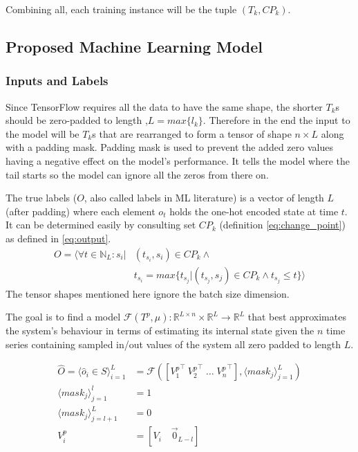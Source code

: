 Combining all, each training instance will be the tuple $(T_k, CP_k)$.

\subsection{Proposed Machine Learning Model}
\subsubsection{Inputs and Labels} \label{data_set_properties}


Since TensorFlow requires all the data to have the same shape, the shorter $T_k$s should be zero-padded to length ,$L = max\{l_k\}$.
Therefore in the end the input to the model will be $T_k$s that are rearranged to form a tensor of shape $n \times L$ along with a padding mask. Padding mask is used to prevent the added zero values having a negative effect on the model's performance. It tells the model where the tail starts so the model can ignore all the zeros from there on.

The true labels ($O$, also called labels in ML literature) is a vector of length $L$ (after padding) where each element $o_t$ holds the one-hot encoded state at time $t$. It can be determined easily by consulting set $CP_k$ (definition \eqref{eq:change_point}) as defined in \eqref{eq:output}.
\begin{equation} \label{eq:output}
\begin{split}
O = \langle  \forall t \in \mathbb{N}_L : s_i | 
            &{} (t_{s_i}, s_i) \in CP_k \land  \\
            & t_{s_i} = max\{t_{s_j} | (t_{s_j}, s_j) \in CP_k \land t_{s_j}\leq t\} \rangle
\end{split}
\end{equation}
The tensor shapes mentioned here ignore the batch size dimension.

The goal is to find a model $\mathcal{F}(T^p, \mu) \colon \mathbb{R}^{L\times n}\times\mathbb{R}^L\to\mathbb{R}^{L}$ that best approximates the system's behaviour in terms of estimating its internal state given the $n$ time series containing sampled in/out values of the system all zero padded to length $L$.

\begin{equation}\label{eq:model_as_function}
\begin{split}
    \hat{O} = \langle \hat{o}_i \in S \rangle^L_{i=1} {}&{}= \mathcal{F}\left(\left[ {V^p_1}^\intercal \: {V^p_2}^\intercal \; \ldots \; {V^p_n}^\intercal \right], \langle {mask}_j \rangle^L_{j=1}\right) \\
    \langle {mask}_j \rangle^l_{j=1} {}&{}= 1  \\
    \langle {mask}_j \rangle^L_{j=l+1} {}&{}= 0 \\
    V^p_i {}&{}= \left[V_i \quad \vec{0}_{L-l}\right]
\end{split}
\end{equation}

